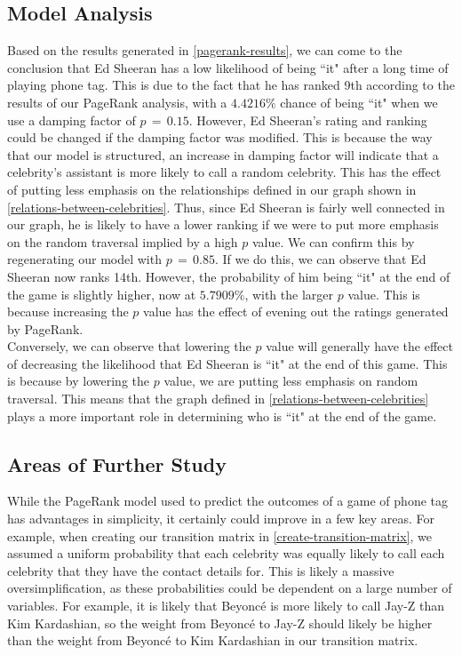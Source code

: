\documentclass[11pt]{article}
\begin{document}
      \subsection{Model Analysis}
      Based on the results generated in \ref{pagerank-results}, we can come to the conclusion that Ed Sheeran has a low likelihood of being ``it" after a long time of playing phone tag. 
      This is due to the fact that he has ranked 9th according to the results of our PageRank analysis, with a $4.4216 \% $ chance of being ``it" when we use a damping factor of $p \, = \, 0.15$.
      However, Ed Sheeran's rating and ranking could be changed if the damping factor was modified.
      This is because the way that our model is structured, an increase in damping factor will indicate that a celebrity's assistant is more likely to call a random celebrity.  
      This has the effect of putting less emphasis on the relationships defined in our graph shown in \ref{relations-between-celebrities}.
      Thus, since Ed Sheeran is fairly well connected in our graph, he is likely to have a lower ranking if we were to put more emphasis on the random traversal implied by a high $p$ value.
      We can confirm this by regenerating our model with $p \, = \, 0.85$.  If we do this, we can observe that Ed Sheeran now ranks 14th.
      However, the probability of him being ``it" at the end of the game is slightly higher, now at $5.7909\%$, with the larger $p$ value.
      This is because increasing the $p$ value has the effect of evening out the ratings generated by PageRank. 
      \\

      Conversely, we can observe that lowering the $p$ value will generally have the effect of decreasing the likelihood that Ed Sheeran is ``it" at the end of this game.
      This is because by lowering the $p$ value, we are putting less emphasis on random traversal.
      This means that the graph defined in \ref{relations-between-celebrities} plays a more important role in determining who is ``it" at the end of the game.
      
      \subsection{Areas of Further Study}
      While the PageRank model used to predict the outcomes of a game of phone tag has advantages in simplicity, it certainly could improve in a few key areas.
      For example, when creating our transition matrix in \ref{create-transition-matrix}, we assumed a uniform probability that each celebrity was equally likely to call each celebrity that they have the contact details for.
      This is likely a massive oversimplification, as these probabilities could be dependent on a large number of variables.
      For example, it is likely that Beyoncé is more likely to call Jay-Z than Kim Kardashian, so the weight from Beyoncé to Jay-Z should likely be higher than the weight from Beyoncé to Kim Kardashian in our transition matrix.
      \\
      
\end{document}
